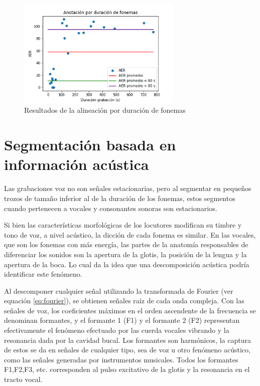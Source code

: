 \begin{figure}[H]
\caption{Resultados de la alineación por duración de fonemas}
\label{img:aer_duracion}
\begin{center}
\includegraphics[width=0.7\textwidth]{imagenes/04_03_aer_duracion_fonemas.png}
\end{center}
\end{figure}


\section{Segmentación basada en información acústica}

Las grabaciones voz no son señales estacionarias, pero al segmentar en pequeños trozos de tamaño inferior al de la duración de los fonemas, estos segmentos cuando pertenecen a vocales y consonantes sonoras son estacionarios.

Si bien las características morfológicas de los locutores modifican su timbre y tono de voz, a nivel acústico, la dicción de cada fonema es similar. En las vocales, que son los fonemas con más energía, las partes de la anatomía responsables de diferenciar los sonidos son la apertura de la glotis, la posici\'on de la lengua y la apertura de la boca. Lo cual da la idea que una descomposición acústica podría identificar este fenómeno.

Al descomponer cualquier señal utilizando la transformada de Fourier (ver equación \ref{eq:fourier}), se obtienen señales raíz de cada onda compleja. Con las señales de voz, los coeficientes máximos  en el orden ascendente de la frecuencia se denominan formantes, y el formante 1 (F1) y el formante 2 (F2) representan efectivamente el fenómeno efectuado por las cuerda vocales vibrando y la resonancia dada por la cavidad bucal. Los formantes son harmónicos, la captura de estos se da en señales de cualquier tipo, sea de voz u otro fenómeno acústico, como las señales generadas por instrumentos musicales. Todos los formantes F1,F2,F3, etc. corresponden al pulso excitativo de la glotis y la resonancia en el tracto vocal.

